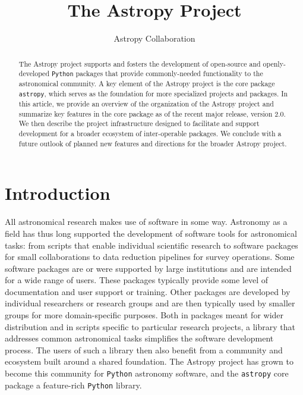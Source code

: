 \documentclass[modern]{aastex61}
\newcommand{\package}[1]{\texttt{#1}\xspace}
\newcommand{\python}{\package{Python}}
\newcommand{\astropy}{Astropy\xspace}
\newcommand{\astropypkg}{\package{astropy}}
\begin{document}
\draft{\today}

\title{The Astropy Project}


\author{Astropy Collaboration}

\begin{abstract}
The \astropy project supports and fosters the development of open-source and openly-developed
\python packages that provide commonly-needed functionality to the astronomical
community.
A key element of the \astropy project is the core package \astropypkg, which serves as the
foundation for more specialized projects and packages.
In this article, we provide an overview of the organization of the \astropy
project and summarize key features in the core package as of the recent major
release, version 2.0.
We then describe the project infrastructure designed to facilitate and support
development for a broader ecosystem of inter-operable packages.
We conclude with a future outlook of planned new features and directions for the
broader \astropy project.
\end{abstract}



\section{Introduction} \label{sec:intro}
All astronomical research makes use of software in some way.  Astronomy as a field has thus long supported the development of software tools
for astronomical tasks: from scripts that enable individual scientific research to software packages for small collaborations to data reduction pipelines for survey operations.
Some software packages are or were supported by large institutions and are intended for a wide range of users. These packages typically provide some level of documentation and user support or
training.
Other packages are developed by individual researchers or research groups and
are then typically used by smaller groups for more domain-specific purposes.
Both in packages meant for wider distribution and in scripts specific to
particular research projects, a library that addresses common astronomical tasks
simplifies the software development process.
The users of such a library then also benefit from a community and ecosystem
built around a shared foundation.
The \astropy project has grown to become this community for \python astronomy
software, and the \astropypkg core package a feature-rich \python library.
\end{document}
